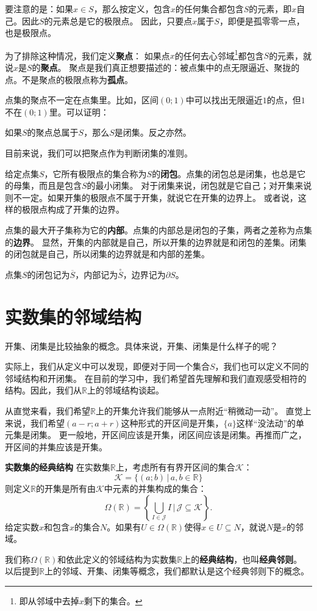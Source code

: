 \documentclass[12pt,UTF8,fontset=none]{ctexbook}
\begin{document}
要注意的是：如果$x\in S$，那么按定义，包含$x$的任何集合都包含$S$的元素，即$x$自己。因此$S$的元素总是它的极限点。
因此，只要点$x$属于$S$，即便是孤零零一点，也是极限点。

为了排除这种情况，我们定义\textbf{聚点}：
如果点$x$的任何去心邻域\footnote{即从邻域中去掉$x$剩下的集合。}都包含$S$的元素，就说$x$是$S$的\textbf{聚点}。
聚点是我们真正想要描述的：被点集中的点无限逼近、聚拢的点。不是聚点的极限点称为\textbf{孤点}。

点集的聚点不一定在点集里。比如，区间$(0;1)$中可以找出无限逼近$1$的点，但$1$不在$(0;1)$里。可以证明：
\begin{tm}
    如果$S$的聚点总属于$S$，那么$S$是闭集。反之亦然。
\end{tm}

目前来说，我们可以把聚点作为判断闭集的准则。

给定点集$S$，它所有极限点的集合称为$S$的\textbf{闭包}。点集的闭包总是闭集，也总是它的母集，而且是包含$S$的最小闭集。
对于闭集来说，闭包就是它自己；对开集来说则不一定。如果开集的极限点不属于开集，就说它在开集的边界上。
或者说，这样的极限点构成了开集的边界。

点集的最大开子集称为它的\textbf{内部}。点集的内部总是闭包的子集，两者之差称为点集的\textbf{边界}。
显然，开集的内部就是自己，所以开集的边界就是和闭包的差集。闭集的闭包就是自己，所以闭集的边界就是和内部的差集。

点集$S$的闭包记为$\overline{S}$，内部记为$\overset{\circ}{S}$，边界记为$\partial S$。

\section{实数集的邻域结构}

开集、闭集是比较抽象的概念。具体来说，开集、闭集是什么样子的呢？

实际上，我们从定义中可以发现，即便对于同一个集合$S$，我们也可以定义不同的邻域结构和开闭集。
在目前的学习中，我们希望首先理解和我们直观感受相符的结构。因此，我们从$\mathbb{R}$上的邻域结构谈起。

从直觉来看，我们希望$\mathbb{R}$上的开集允许我们能够从一点附近“稍微动一动”。
直觉上来说，我们希望$(a-r;a+r)$这种形式的开区间是开集，$\{a\}$这样“没法动”的单元集是闭集。
更一般地，开区间应该是开集，闭区间应该是闭集。再推而广之，开区间的并集应该是开集。

\begin{tm}{\textbf{实数集的经典结构}}
    在实数集$\mathbb{R}$上，考虑所有有界开区间的集合$\mathcal{K}$：
    $$ \mathcal{K} = \{ (a;b) \, | \, a, b \in \mathbb{R} \}$$
    则定义$\mathbb{R}$的开集是所有由$\mathcal{K}$中元素的并集构成的集合：
    $$ \Omega(\mathbb{R}) = \left\{\bigcup_{I \in \mathcal{J}} I \, \Bigg| \,\mathcal{J} \subseteq  \mathcal{K} \right\}.$$
    给定实数$x$和包含$x$的集合$N$。如果有$U\in\Omega(\mathbb{R})$使得$x\in U\subseteq N$，就说$N$是$x$的邻域。

    我们称$\Omega(\mathbb{R})$和依此定义的邻域结构为实数集$\mathbb{R}$上的\textbf{经典结构}，也叫\textbf{经典邻则}。
    以后提到$\mathbb{R}$上的邻域、开集、闭集等概念，我们都默认是这个经典邻则下的概念。
\end{tm}
\end{document}
